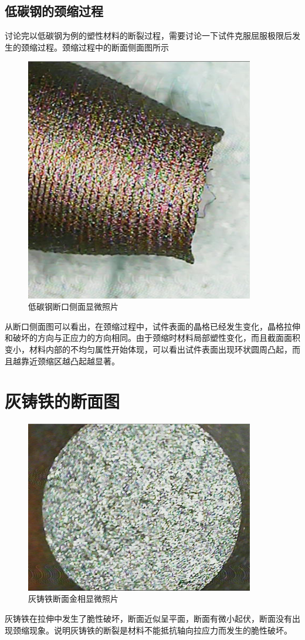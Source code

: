 \documentclass[12pt, a4paper]{ctexart}
\begin{document}
\subsection{低碳钢的颈缩过程}

讨论完以低碳钢为例的塑性材料的断裂过程，需要讨论一下试件克服屈服极限后发生的颈缩过程。颈缩过程中的断面侧面图所示

\begin{figure}[htbp]
		\centering
		\includegraphics[width=10cm]{44.png}
		\caption{低碳钢断口侧面显微照片}
\end{figure}
从断口侧面图可以看出，在颈缩过程中，试件表面的晶格已经发生变化，晶格拉伸和破坏的方向与正应力的方向相同。由于颈缩时材料局部塑性变化，而且截面面积变小，材料内部的不均匀属性开始体现，可以看出试件表面出现环状圆周凸起，而且越靠近颈缩区越凸起越显著。

\section{灰铸铁的断面图}

\begin{figure}[htbp]
	\centering
	\includegraphics[width=10cm]{45.png}
	\caption{灰铸铁断面金相显微照片}
\end{figure}	

灰铸铁在拉伸中发生了脆性破坏，断面近似呈平面，断面有微小起伏，断面没有出现颈缩现象。说明灰铸铁的断裂是材料不能抵抗轴向拉应力而发生的脆性破坏。
\end{document}
